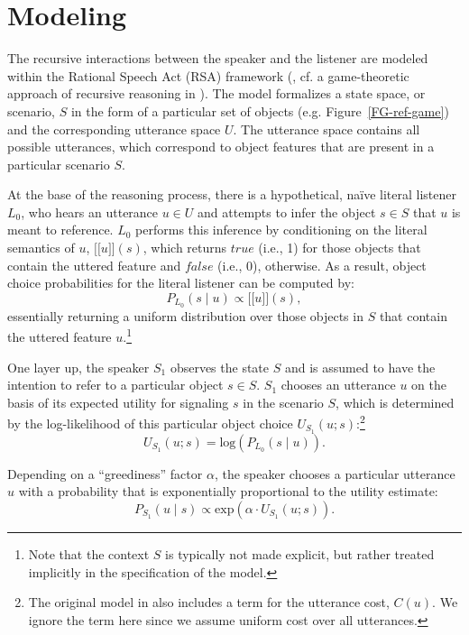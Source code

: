 \documentclass[10pt,a4paper]{article}
\newcommand{\sem}[1]{\mbox{$[\![$#1$]\!]$}}
\begin{document}
\section{Modeling}

The recursive interactions between the speaker and the listener are modeled within the Rational Speech Act (RSA)  framework (, cf. a game-theoretic approach of recursive reasoning in ).
The model formalizes a state space, or scenario, $S$ in the form of a particular set of objects (e.g. Figure~\ref{FG-ref-game}) and the corresponding utterance space $U$.
The utterance space contains all possible utterances, which correspond to object features that are present in a particular scenario $S$.

At the base of the reasoning process, there is a hypothetical, na\"ive literal listener $L_0$, who hears an utterance $u\in U$ and attempts to infer the object $s \in S$ that $u$ is meant to reference. 
$L_0$ performs this inference by conditioning on the literal semantics of $u$, \sem{$u$}$(s)$, which returns $true$ (i.e., 1) for those objects that contain the uttered feature and $false$ (i.e., 0), otherwise.
As a result, object choice probabilities for the literal listener can be computed by: 
\begin{equation}
P_{L_{0}}(s\mid u) \propto \sem{$u$}(s),
\end{equation}
essentially returning a uniform distribution over those objects in $S$ that contain the uttered feature $u$.\footnote{Note that the context $S$ is typically not made explicit, but rather treated implicitly in the specification of the model.}


One layer up, the speaker $S_1$ observes the state $S$ and is assumed to have the intention to refer to a particular object $s \in S$.
$S_1$ chooses an utterance $u$ on the basis of its expected utility for signaling $s$ in the scenario $S$, which is determined by the log-likelihood of this particular object choice $U_{S_1}(u;s)$:\footnote{The original model in  also includes a term for the utterance cost, $C(u)$. We ignore the term here since we assume uniform cost over all utterances.}
\begin{equation}
U_{S_{1}}(u;s) = \textrm{log}(P_{L_{0}}(s \mid u)).
\end{equation}

Depending on a ``greediness'' factor $\alpha$, the speaker chooses a particular utterance $u$ with a probability that is exponentially proportional to the utility estimate: 
\begin{equation}
P_{S_{1}} (u \mid s) \propto   \textrm{exp}(\alpha \cdot U_{S_{1}} (u;s)).
\end{equation}
\end{document}

